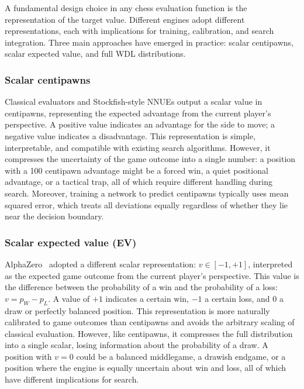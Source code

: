 A fundamental design choice in any chess evaluation function is the representation of the target value. Different engines adopt different representations, each with implications for training, calibration, and search integration. Three main approaches have emerged in practice: scalar centipawns, scalar expected value, and full WDL distributions.

\subsubsection{Scalar centipawns}\label{sec:centipawns}

Classical evaluators and Stockfish-style NNUEs output a scalar value in centipawns, representing the expected advantage from the current player's perspective. A positive value indicates an advantage for the side to move; a negative value indicates a disadvantage. This representation is simple, interpretable, and compatible with existing search algorithms. However, it compresses the uncertainty of the game outcome into a single number: a position with a 100 centipawn advantage might be a forced win, a quiet positional advantage, or a tactical trap, all of which require different handling during search. Moreover, training a network to predict centipawns typically uses mean squared error, which treats all deviations equally regardless of whether they lie near the decision boundary.

\subsubsection{Scalar expected value (EV)}\label{sec:ev}

AlphaZero~\cite{silver2018alphazero} adopted a different scalar representation: \(v \in [-1, +1]\), interpreted as the expected game outcome from the current player's perspective. This value is the difference between the probability of a win and the probability of a loss: \(v = p_W - p_L\). A value of \(+1\) indicates a certain win, \(-1\) a certain loss, and \(0\) a draw or perfectly balanced position. This representation is more naturally calibrated to game outcomes than centipawns and avoids the arbitrary scaling of classical evaluation. However, like centipawns, it compresses the full distribution into a single scalar, losing information about the probability of a draw. A position with \(v = 0\) could be a balanced middlegame, a drawish endgame, or a position where the engine is equally uncertain about win and loss, all of which have different implications for search.

